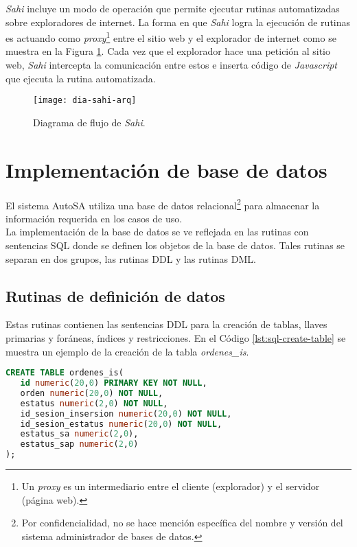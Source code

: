 \textit{Sahi} incluye un modo de operación que permite ejecutar rutinas automatizadas sobre exploradores de internet. La forma en que \textit{Sahi} logra la ejecución de rutinas es actuando como \textit{proxy}\footnote{Un \textit{proxy} es un intermediario entre el cliente (explorador) y el servidor (página web)\cite{BeginningUbuntuLinux}.} entre el sitio web y el explorador de internet como se muestra en la Figura \ref{fig:dia-sahi-arq}. Cada vez que el explorador hace una petición al sitio web, \textit{Sahi} intercepta la comunicación entre estos e inserta código de \textit{Javascript} que ejecuta la rutina automatizada\cite{WebEng9IntConf, SahiPro}.

\begin{figure}[h]
\centering
\texttt{[image: dia-sahi-arq]}
\caption{Diagrama de flujo de \textit{Sahi}\cite{SahiPro}.}
\label{fig:dia-sahi-arq}
\end{figure}

%

\section{Implementación de base de datos}\label{sec:impl-db}
El sistema AutoSA utiliza una base de datos relacional\footnote{Por confidencialidad, no se hace mención específica del nombre y versión del sistema administrador de bases de datos.} para almacenar la información requerida en los casos de uso.\\
La implementación de la base de datos se ve reflejada en las rutinas con sentencias SQL donde se definen los objetos de la base de datos. Tales rutinas se separan en dos grupos, las rutinas DDL y las rutinas DML.

\subsection{Rutinas de definición de datos}
Estas rutinas contienen las sentencias DDL para la creación de tablas, llaves primarias y foráneas, índices y restricciones. En el Código \ref{lst:sql-create-table} se muestra un ejemplo de la creación de la tabla \textit{ordenes\_is}.
\begin{lstlisting}[language=SQL, caption={Sentencia para crear una tabla.}, captionpos=b, label={lst:sql-create-table}]
CREATE TABLE ordenes_is(
   id numeric(20,0) PRIMARY KEY NOT NULL,
   orden numeric(20,0) NOT NULL,
   estatus numeric(2,0) NOT NULL,
   id_sesion_insersion numeric(20,0) NOT NULL,
   id_sesion_estatus numeric(20,0) NOT NULL,
   estatus_sa numeric(2,0),
   estatus_sap numeric(2,0)
);
\end{lstlisting}

